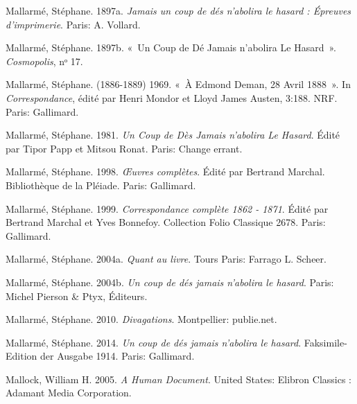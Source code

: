 \begin{CSLReferences}{1}{0}
\leavevmode{}%
Mallarmé, Stéphane. 1897a. \emph{{Jamais un coup de d{é}s n'abolira le
hasard : {É}preuves d'imprimerie}}. {Paris}: {A. Vollard}.

\leavevmode{}%
Mallarmé, Stéphane. 1897b. {«~Un {Coup} de {D{é}} Jamais n'abolira Le
{Hasard}~»}. \emph{Cosmopolis}, nᵒ 17.

\leavevmode{}%
Mallarmé, Stéphane. (1886-1889) 1969. {«~{À} {Edmond Deman}, 28 Avril
1888~»}. In \emph{Correspondance}, édité par Henri Mondor et Lloyd James
Austen, 3:188. {NRF}. {Paris}: {Gallimard}.

\leavevmode{}%
Mallarmé, Stéphane. 1981. \emph{Un Coup de D{è}s Jamais n'abolira Le
Hasard}. Édité par Tipor Papp et Mitsou Ronat. {Paris}: {Change errant}.

\leavevmode{}%
Mallarmé, Stéphane. 1998. \emph{{{Œ}uvres compl{è}tes}}. Édité par
Bertrand Marchal. {Biblioth{è}que de la Pl{é}iade}. {Paris}:
{Gallimard}.

\leavevmode{}%
Mallarmé, Stéphane. 1999. \emph{{Correspondance compl{è}te 1862 -
1871}}. Édité par Bertrand Marchal et Yves Bonnefoy. {Collection Folio
Classique} 2678. {Paris}: {Gallimard}.

\leavevmode{}%
Mallarmé, Stéphane. 2004a. \emph{{Quant au livre}}. {Tours Paris}:
{Farrago L. Scheer}.

\leavevmode{}%
Mallarmé, Stéphane. 2004b. \emph{{Un coup de d{é}s jamais n'abolira le
hasard}}. {Paris}: {Michel Pierson \& Ptyx, {É}diteurs}.

\leavevmode{}%
Mallarmé, Stéphane. 2010. \emph{{Divagations}}. {Montpellier}:
{publie.net}.

\leavevmode{}%
Mallarmé, Stéphane. 2014. \emph{{Un coup de d{é}s jamais n'abolira le
hasard}}. Faksimile-Edition der Ausgabe 1914. {Paris}: {Gallimard}.

\leavevmode{}%
Mallock, William H. 2005. \emph{A {Human Document}}. {United States}:
{Elibron Classics : Adamant Media Corporation}.


\end{CSLReferences}
